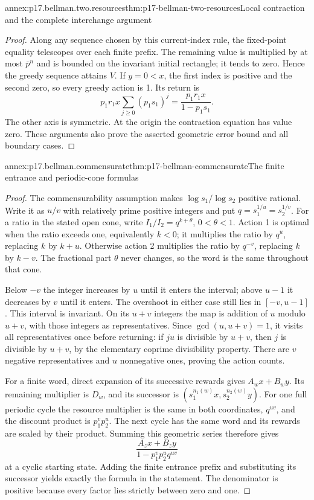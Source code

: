 \begin{annexitem}{annex:p17.bellman.two.resources}{thm:p17-bellman-two-resources}{Local contraction and the complete interchange argument}
\begin{proof}
Along any sequence chosen by
this current-index rule, the
fixed-point equality telescopes
over each finite prefix.
The remaining value is multiplied
by at most \(\bar p^n\) and
is bounded on the invariant
initial rectangle; it tends
to zero. Hence the greedy
sequence attains \(V\).
If \(y=0<x\), the first
index is positive and the
second zero, so every greedy
action is 1. Its return is
\[
            p_1r_1x\sum_{j\geq0}(p_1s_1)^j
                             =\frac{p_1r_1x}{1-p_1s_1}.
\]
The other axis is symmetric.
At the origin the contraction
equation has value zero.
These arguments also prove
the asserted geometric error
bound and all boundary cases.
\end{proof}
\end{annexitem}

\begin{annexitem}{annex:p17.bellman.commensurate}{thm:p17-bellman-commensurate}{The finite entrance and periodic-cone formulas}
\begin{proof}
The commensurability assumption
makes \(\log s_1/\log s_2\)
positive rational. Write it
as \(u/v\) with relatively
prime positive integers and
put \(q=s_1^{1/u}=s_2^{1/v}\).
For a ratio in the stated
open cone, write \(I_1/I_2=q^{k+\theta}\),
\(0<\theta<1\).
Action 1 is optimal when the
ratio exceeds one, equivalently
\(k<0\); it multiplies the
ratio by \(q^u\), replacing
\(k\) by \(k+u\).
Otherwise action 2 multiplies
the ratio by \(q^{-v}\),
replacing \(k\) by \(k-v\).
The fractional part \(\theta\)
never changes, so the word is
the same throughout that cone.

Below \(-v\) the integer
increases by \(u\) until it
enters the interval; above
\(u-1\) it decreases by \(v\)
until it enters. The overshoot
in either case still lies in
\([-v,u-1]\).
This interval is invariant.
On its \(u+v\) integers the
map is addition of \(u\)
modulo \(u+v\), with those
integers as representatives.
Since \(\gcd(u,u+v)=1\),
it visits all representatives
once before returning: if
\(ju\) is divisible by \(u+v\),
then \(j\) is divisible by
\(u+v\), by the elementary
coprime divisibility property.
There are \(v\) negative
representatives and \(u\)
nonnegative ones, proving
the action counts.

For a finite word, direct
expansion of its successive
rewards gives \(A_wx+B_wy\).
Its remaining multiplier is
\(D_w\), and its successor
is \((s_1^{n_1(w)}x,s_2^{n_2(w)}y)\).
For one full periodic cycle
the resource multiplier is
the same in both coordinates,
\(q^{uv}\), and the discount
product is \(p_1^vp_2^u\).
The next cycle has the same
word and its rewards are
scaled by their product.
Summing this geometric series
therefore gives
\[
                 \frac{A_zx+B_zy}
                              {1-p_1^vp_2^u q^{uv}}
\]
at a cyclic starting state.
Adding the finite entrance
prefix and substituting its
successor yields exactly the
formula in the statement.
The denominator is positive
because every factor lies
strictly between zero and one.


\end{proof}
\end{annexitem}

